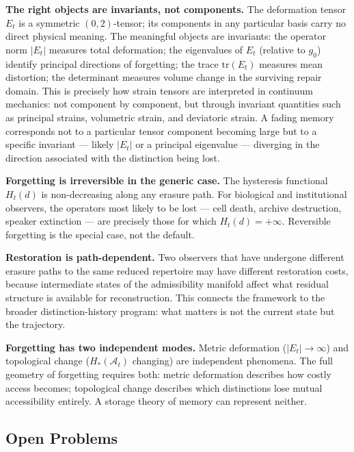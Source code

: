\documentclass[12pt, oneside]{article}
\theoremstyle{plain}
\theoremstyle{definition}
\theoremstyle{remark}
\newcommand{\At}{\mathcal{A}_t}
\newcommand{\Et}{E_t}
\newcommand{\gzero}{g_0}
\newcommand{\Hyster}{H}
\begin{document}
\medskip\noindent
\textbf{The right objects are invariants, not components.}\;
The deformation tensor $\Et$ is a symmetric $(0,2)$-tensor; its
components in any particular basis carry no direct physical
meaning.
The meaningful objects are invariants: the operator norm $|\Et|$
measures total deformation; the eigenvalues of $\Et$ (relative to
$\gzero$) identify principal directions of forgetting; the trace
$\mathrm{tr}(\Et)$ measures mean distortion; the determinant
measures volume change in the surviving repair domain.
This is precisely how strain tensors are interpreted in continuum
mechanics: not component by component, but through invariant
quantities such as principal strains, volumetric strain, and
deviatoric strain.
A fading memory corresponds not to a particular tensor component
becoming large but to a specific invariant --- likely $|\Et|$ or
a principal eigenvalue --- diverging in the direction associated
with the distinction being lost.

\medskip\noindent
\textbf{Forgetting is irreversible in the generic case.}\;
The hysteresis functional $\Hyster_t(d)$ is non-decreasing along
any erasure path.
For biological and institutional observers, the operators most
likely to be lost --- cell death, archive destruction, speaker
extinction --- are precisely those for which
$\Hyster_t(d) = +\infty$.
Reversible forgetting is the special case, not the default.

\medskip\noindent
\textbf{Restoration is path-dependent.}\;
Two observers that have undergone different erasure paths to the
same reduced repertoire may have different restoration costs,
because intermediate states of the admissibility manifold affect
what residual structure is available for reconstruction.
This connects the framework to the broader distinction-history
program: what matters is not the current state but the trajectory.

\medskip\noindent
\textbf{Forgetting has two independent modes.}\;
Metric deformation ($|\Et| \to \infty$) and topological change
($H_*(\At)$ changing) are independent phenomena.
The full geometry of forgetting requires both: metric deformation
describes how costly access becomes; topological change describes
which distinctions lose mutual accessibility entirely.
A storage theory of memory can represent neither.

\subsection*{Open Problems}
\end{document}

